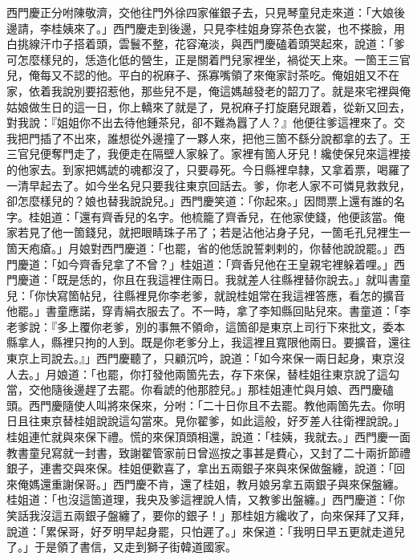 西門慶正分咐陳敬濟，交他往門外徐四家催銀子去，只見琴童兒走來道：「大娘後邊請，李桂姨來了。」西門慶走到後邊，只見李桂姐身穿茶色衣裳，也不搽臉，用白挑線汗巾子搭着頭，雲鬟不整，花容淹淡，與西門慶磕着頭哭起來，說道：「爹可怎麼樣兒的，恁造化低的營生，正是關着門兒家裡坐，禍從天上來。一箇王三官兒，俺每又不認的他。平白的祝麻子、孫寡嘴領了來俺家討茶吃。俺姐姐又不在家，依着我說別要招惹他，那些兒不是，{}俺這媽越發老的韶刀了。就是來宅裡與俺姑娘做生日的這一日，你上轎來了就是了，見祝麻子打旋磨兒跟着，從新又回去，對我說：『姐姐你不出去待他鍾茶兒，卻不難為囂了人？』他便往爹這裡來了。交我把門插了不出來，誰想從外邊撞了一夥人來，把他三箇不繇分說都拿的去了。王三官兒便奪門走了，我便走在隔壁人家躲了。家裡有箇人牙兒！纔使保兒來這裡接的他家去。到家把媽諕的魂都沒了，只要尋死。今日縣裡皁隸，又拿着票，喝羅了一清早起去了。如今坐名兒只要我往東京回話去。爹，你老人家不可憐見救救兒，卻怎麼樣兒的？娘也替我說說兒。」{}西門慶笑道：「你起來。」因問票上還有誰的名字。桂姐道：「還有齊香兒的名字。他梳籠了齊香兒，在他家使錢，他便該當。{}俺家若見了他一箇錢兒，就把眼睛珠子吊了；若是沾他沾身子兒，一箇毛孔兒裡生一箇天疱瘡。」月娘對西門慶道：「也罷，省的他恁說誓剌剌的，你替他說說罷。」西門慶道：「如今齊香兒拿了不曾？」桂姐道：「齊香兒他在王皇親宅裡躲着哩。」西門慶道：「既是恁的，你且在我這裡住兩日。我就差人往縣裡替你說去。」就叫書童兒：「你快寫箇帖兒，往縣裡見你李老爹，就說桂姐常在我這裡答應，看怎的擴音他罷。」書童應諾，穿青絹衣服去了。不一時，拿了李知縣回貼兒來。書童道：「李老爹說：『多上覆你老爹，別的事無不領命，這箇卻是東京上司行下來批文，委本縣拿人，縣裡只拘的人到。既是你老爹分上，我這裡且寬限他兩日。要擴音，還往東京上司說去。』」西門慶聽了，只顧沉吟，說道：「如今來保一兩日起身，東京沒人去。」月娘道：「也罷，你打發他兩箇先去，存下來保，替桂姐往東京說了這勾當，交他隨後邊趕了去罷。你看諕的他那腔兒。」那桂姐連忙與月娘、西門慶磕頭。{}西門慶隨使人叫將來保來，分咐：「二十日你且不去罷。教他兩箇先去。你明日且往東京替桂姐說說這勾當來。見你翟爹，如此這般，好歹差人往衛裡說說。」桂姐連忙就與來保下禮。慌的來保頂頭相還，說道：「桂姨，我就去。」{}西門慶一面教書童兒寫就一封書，致謝翟管家前日曾巡按之事甚是費心，又封了二十兩折節禮銀子，連書交與來保。桂姐便歡喜了，拿出五兩銀子來與來保做盤纏，說道：「回來俺媽還重謝保哥。」西門慶不肯，還了桂姐，教月娘另拿五兩銀子與來保盤纏。桂姐道：「也沒這箇道理，我央及爹這裡說人情，又教爹出盤纏。」西門慶道：「你笑話我沒這五兩銀子盤纏了，要你的銀子！」{}那桂姐方纔收了，向來保拜了又拜，說道：「累保哥，好歹明早起身罷，只怕遲了。」來保道：「我明日早五更就走道兒了。」于是領了書信，又走到獅子街韓道國家。

